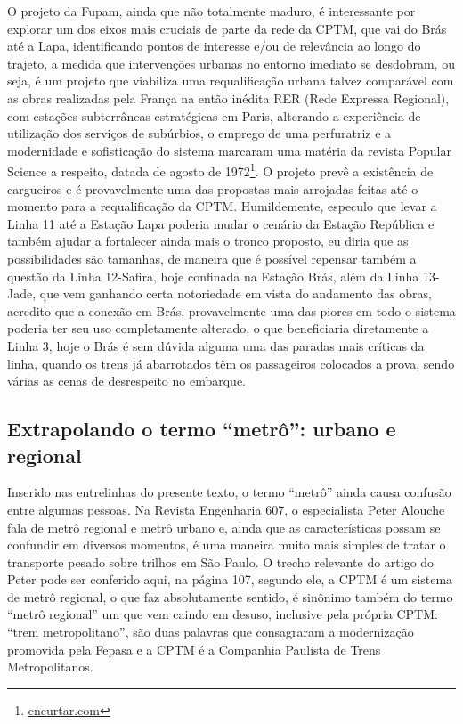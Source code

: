 \documentclass[11pt,fleqn]{book} %
\begin{document}
O projeto da Fupam, ainda que não totalmente maduro, é interessante por explorar um dos eixos mais cruciais de parte da rede da CPTM, que vai do Brás até a Lapa, identificando pontos de interesse e/ou de relevância ao longo do trajeto, a medida que intervenções urbanas no entorno imediato se desdobram, ou seja, é um projeto que viabiliza uma requalificação urbana talvez comparável com as obras realizadas pela França na então inédita RER (Rede Expressa Regional), com estações subterrâneas estratégicas em Paris, alterando a experiência de utilização dos serviços de subúrbios, o emprego de uma perfuratriz e a modernidade e sofisticação do sistema marcaram uma matéria da revista Popular Science a respeito, datada de agosto de 1972\footnote{\url{encurtar.com}}. O projeto prevê a existência de cargueiros e é provavelmente uma das propostas mais arrojadas feitas até o momento para a requalificação da CPTM. Humildemente, especulo que levar a Linha 11 até a Estação Lapa poderia mudar o cenário da Estação República e também ajudar a fortalecer ainda mais o tronco proposto, eu diria que as possibilidades são tamanhas, de maneira que é possível repensar também a questão da Linha 12-Safira, hoje confinada na Estação Brás, além da Linha 13-Jade, que vem ganhando certa notoriedade em vista do andamento das obras, acredito que a conexão em Brás, provavelmente uma das piores em todo o sistema poderia ter seu uso completamente alterado, o que beneficiaria diretamente a Linha 3, hoje o Brás é sem dúvida alguma uma das paradas mais críticas da linha, quando os trens já abarrotados têm os passageiros colocados a prova, sendo várias as cenas de desrespeito no embarque.

\subsection{Extrapolando o termo ``metrô'': urbano e regional}

Inserido nas entrelinhas do presente texto, o termo ``metrô'' ainda causa confusão entre algumas pessoas. Na Revista Engenharia 607, o especialista Peter Alouche fala de metrô regional e metrô urbano e, ainda que as características possam se confundir em diversos momentos, é uma maneira muito mais simples de tratar o transporte pesado sobre trilhos em São Paulo. O trecho relevante do artigo do Peter pode ser conferido aqui, na página 107, segundo ele, a CPTM é um sistema de metrô regional, o que faz absolutamente sentido, é sinônimo também do termo “metrô regional” um que vem caindo em desuso, inclusive pela própria CPTM: “trem metropolitano”, são duas palavras que consagraram a modernização promovida pela Fepasa e a CPTM é a Companhia Paulista de Trens Metropolitanos.
\end{document}
